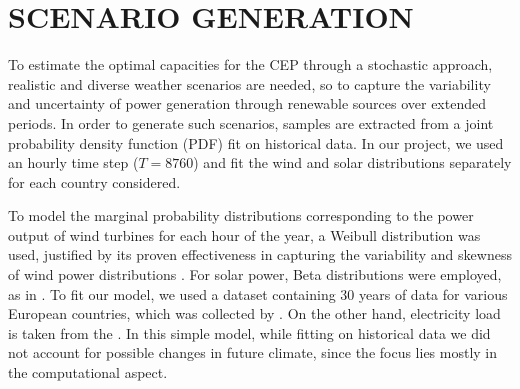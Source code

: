\documentclass[smallextended,natbib]{svjour3}       %
\numberwithin{theorem}{section}
\begin{document}















\newpage
\appendix

\section{SCENARIO GENERATION}\label{generation}

To estimate the optimal capacities for the CEP through a stochastic approach, realistic and diverse weather scenarios are needed, so to capture the variability and uncertainty of power generation through renewable sources over extended periods. 
In order to generate such scenarios, samples are extracted from a joint probability density function (PDF) fit on historical data. 
In our project, we used an hourly time step ($T=8760$) and fit the wind and solar distributions separately for each country considered.

To model the marginal probability distributions corresponding to the power output of wind turbines for each hour of the year, a Weibull distribution was used, justified by its proven effectiveness in capturing the variability and skewness of wind power distributions \citep{weibullwind}. 
For solar power, Beta distributions were employed, as in \citet{betaPV}.
To fit our model, we used a dataset containing 30 years of data for various European countries, which was collected by \citet{30y_gen}. 
On the other hand, electricity load is taken from the \citet{ENTSOE_PowerStats}.
In this simple model, while fitting on historical data we did not account for possible changes in future climate, since the focus lies mostly in the computational aspect.
\end{document}

